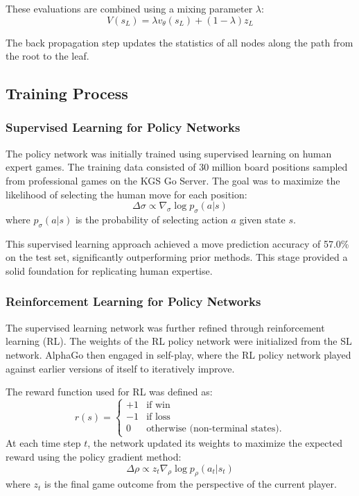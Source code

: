 These evaluations are combined using a mixing parameter \( \lambda \):
\[
V(s_L) = \lambda v_\theta(s_L) + (1 - \lambda) z_L
\]

The back propagation step updates the statistics of all nodes along the path from the root to the leaf.


\subsection{Training Process}

\subsubsection{Supervised Learning for Policy Networks}
The policy network was initially trained using supervised learning on human expert games. The training data consisted of 30 million board positions sampled from professional games on the KGS Go Server. The goal was to maximize the likelihood of selecting the human move for each position:
\[
\Delta \sigma \propto \nabla_\sigma \log p_\sigma(a | s)
\]
where \( p_\sigma(a | s) \) is the probability of selecting action \( a \) given state \( s \).

This supervised learning approach achieved a move prediction accuracy of 57.0\% on the test set, significantly outperforming prior methods. This stage provided a solid foundation for replicating human expertise.

\subsubsection{Reinforcement Learning for Policy Networks}
The supervised learning network was further refined through reinforcement learning (RL). The weights of the RL policy network were initialized from the SL network. AlphaGo then engaged in self-play, where the RL policy network played against earlier versions of itself to iteratively improve.

The reward function used for RL was defined as:
\[
r(s) = 
\begin{cases} 
+1 & \text{if win} \\
-1 & \text{if loss} \\
0 & \text{otherwise (non-terminal states).}
\end{cases}
\]
At each time step \( t \), the network updated its weights to maximize the expected reward using the policy gradient method:
\[
\Delta \rho \propto z_t \nabla_\rho \log p_\rho(a_t | s_t)
\]
where \( z_t \) is the final game outcome from the perspective of the current player.

